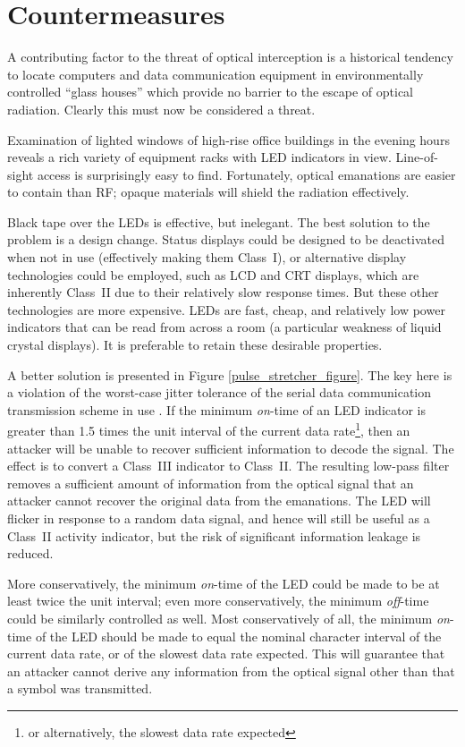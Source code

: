\documentclass{acmtrans2e}
\begin{document}
\section{Countermeasures}\label{section:countermeasures}

A contributing factor to the threat of optical interception is a
historical tendency to locate computers and data communication equipment 
in environmentally controlled ``glass houses'' which provide no barrier 
to the escape of optical radiation.  Clearly this must now be considered 
a threat.

Examination of lighted windows of high-rise office buildings in the 
evening hours reveals a rich variety of equipment racks with LED 
indicators in view.  Line-of-sight access is surprisingly easy to find.  
Fortunately, optical emanations are easier to contain than RF; opaque 
materials will shield the radiation effectively.
 
Black tape over the LEDs is effective, but inelegant.
The best solution to the problem is a design change.
Status displays could be designed 
to be deactivated when not in use (effectively making them Class~I),
or alternative display technologies could be employed, such as LCD
and CRT displays, which are 
inherently Class~II due to their relatively slow response times.  But 
these other technologies are more expensive.  LEDs are fast, cheap,
and relatively 
low power indicators that can be read from across a room (a particular 
weakness of liquid crystal displays).  It is preferable to retain these
desirable properties.

A better solution is presented in Figure \ref{pulse_stretcher_figure}.  
The key here is a violation of the worst-case jitter tolerance of the
serial data communication transmission scheme in use \cite{tia_eia_404_b}.
If the minimum {\it on}-time of an LED indicator is 
greater than 1.5 times the unit interval of the current data 
rate\footnote{or alternatively, the slowest data rate expected}, then
an attacker will be unable to recover sufficient information to decode 
the signal.  The effect is to convert a Class~III indicator to Class~II.
The resulting low-pass filter removes a sufficient amount of information from
the optical signal that an attacker cannot recover the original data
from the emanations.  The LED will flicker in response to a random data
signal, and hence will still be useful as a Class~II activity indicator,
but the risk of significant information leakage is reduced.

More conservatively, the minimum
{\it on}-time of the LED could be made to be at least twice the unit interval;
even more conservatively, the minimum {\it off}-time could be similarly
controlled as well.  Most conservatively of all, the minimum {\it on}-time
of the LED should be made to equal the nominal character interval of
the current data rate, or of the slowest data rate expected.  This
will guarantee that an attacker cannot derive any information
from the optical signal other than that a symbol was transmitted.
\end{document}
